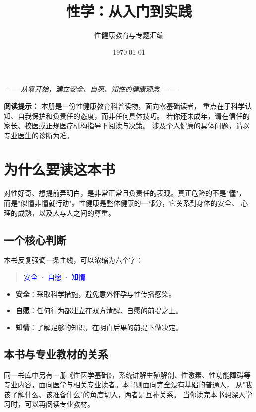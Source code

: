 \documentclass[12pt,UTF8,openany]{ctexbook}
\title{\myhei\zihao{0} 性学：从入门到实践}
\author{性健康教育与专题汇编}
\date{\today}
\newcommand{\myhei}{\CJKfamily{hei}}
\begin{document}
\maketitle

\begin{center}
\itshape{}
—— 从零开始，建立安全、自愿、知性的健康观念 ——
\end{center}

\vspace{1em}

\noindent\textbf{阅读提示：} 本册是一份性健康教育科普读物，面向零基础读者，
重点在于科学认知、自我保护和负责任的态度，而非任何具体技巧。
若你还未成年，请在信任的家长、校医或正规医疗机构指导下阅读与决策。
涉及个人健康的具体问题，请以专业医生的诊断为准。

\tableofcontents


\chapter{为什么要读这本书}

对性好奇、想提前弄明白，是非常正常且负责任的表现。真正危险的不是"懂"，
而是"似懂非懂就行动"。性健康是整体健康的一部分，它关系到身体的安全、
心理的成熟，以及人与人之间的尊重。

\section{一个核心判断}

本书反复强调一条主线，可以浓缩为六个字：

\begin{quote}
\centering \myhei{}\textcolor{blue}{安全 · 自愿 · 知情}
\end{quote}

\begin{itemize}
  \item \textbf{安全}：采取科学措施，避免意外怀孕与性传播感染。
  \item \textbf{自愿}：任何行为都建立在双方清醒、自愿的前提之上。
  \item \textbf{知情}：了解足够的知识，在明白后果的前提下做决定。
\end{itemize}

\section{本书与专业教材的关系}

同一书库中另有一册《性医学基础》，系统讲解生殖解剖、性激素、性功能障碍等
专业内容，面向医学与相关专业读者。本书则面向完全没有基础的普通人，
从"我该了解什么、该准备什么"的角度切入，两者是互补关系。
当你读完本书想深入学习时，可以再阅读专业教材。
\end{document}
